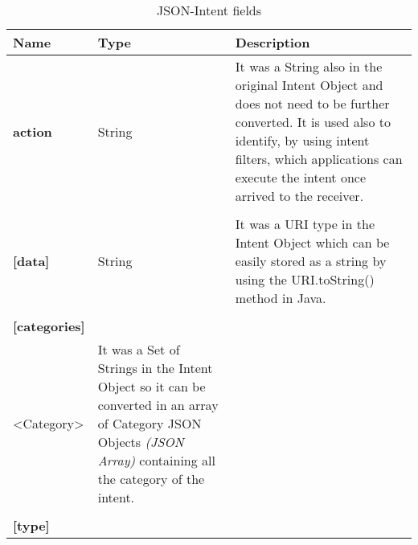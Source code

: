 \begin{table}[h!]
	\caption{JSON-Intent fields}
	\label{tab:JSON-Intent}
	\centering
	\begin{center}
		
		\begin{tabular}{>{\centering\arraybackslash} m{}p{}p{}}
			
			\toprule
			\centering\textbf{Name} & \centering\textbf{Type}  &	\textbf{Description} \\
			\midrule
			\centering\textbf{action} & \begin{minipage}[t]{0.25\textwidth}
				\centering
				String
			\end{minipage} & \begin{minipage}[t]{0.55\textwidth}
				It was a String also in the original Intent Object and does not need to be further converted. It is used also to identify, by using intent filters, which applications can execute the intent once arrived to the receiver.
			\end{minipage}\\%
			&&\\
			\centering\textbf{[data]}\footnotemark[1] & \begin{minipage}[t]{0.25\textwidth}
				\centering
				String
			\end{minipage} & \begin{minipage}[t]{0.55\textwidth}
				It was a URI type in the Intent Object which can be easily stored as a string by using the URI.toString() method in Java.
			\end{minipage}\\%
			&&\\
			\centering\textbf{[categories]} & \begin{minipage}[t]{0.25\textwidth}
				\centering
				Array\\<Category> \footnotemark[2]
			\end{minipage} & \begin{minipage}[t]{0.55\textwidth}
				It was a Set of Strings in the Intent Object so it can be converted in an array of Category JSON Objects \textit{(JSON Array)} containing all the category of the intent.
			\end{minipage}\\%
			&&\\
			\centering\textbf{[type]}\footnotemark[1] & \begin{minipage}[t]{0.25\textwidth}

\end{minipage}
\end{tabular}
\end{center}
\end{table}
